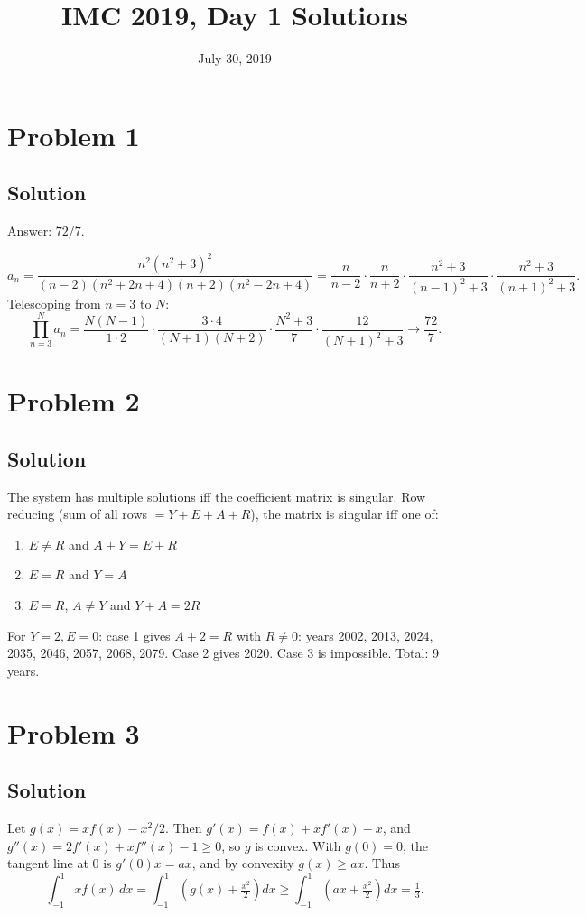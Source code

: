 \documentclass{article}
\title{IMC 2019, Day 1 Solutions}
\date{July 30, 2019}
\begin{document}
\maketitle

\section*{Problem 1}
\subsection*{Solution}
Answer: $72/7$.

\[ a_n = \frac{n^2(n^2+3)^2}{(n-2)(n^2+2n+4)(n+2)(n^2-2n+4)} = \frac{n}{n-2} \cdot \frac{n}{n+2} \cdot \frac{n^2+3}{(n-1)^2+3} \cdot \frac{n^2+3}{(n+1)^2+3}. \]
Telescoping from $n = 3$ to $N$:
\[ \prod_{n=3}^N a_n = \frac{N(N-1)}{1 \cdot 2} \cdot \frac{3 \cdot 4}{(N+1)(N+2)} \cdot \frac{N^2+3}{7} \cdot \frac{12}{(N+1)^2+3} \to \frac{72}{7}. \]

\section*{Problem 2}
\subsection*{Solution}
The system has multiple solutions iff the coefficient matrix is singular. Row reducing (sum of all rows $= Y+E+A+R$), the matrix is singular iff one of:
\begin{enumerate}
\item $E \neq R$ and $A + Y = E + R$
\item $E = R$ and $Y = A$
\item $E = R$, $A \neq Y$ and $Y + A = 2R$
\end{enumerate}
For $Y = 2, E = 0$: case 1 gives $A + 2 = R$ with $R \neq 0$: years 2002, 2013, 2024, 2035, 2046, 2057, 2068, 2079. Case 2 gives 2020. Case 3 is impossible. Total: 9 years.

\section*{Problem 3}
\subsection*{Solution}
Let $g(x) = x f(x) - x^2/2$. Then $g'(x) = f(x) + x f'(x) - x$, and $g''(x) = 2 f'(x) + x f''(x) - 1 \geq 0$, so $g$ is convex. With $g(0) = 0$, the tangent line at $0$ is $g'(0) x = ax$, and by convexity $g(x) \geq ax$. Thus
\[ \int_{-1}^1 x f(x)\, dx = \int_{-1}^1 \left(g(x) + \tfrac{x^2}{2}\right) dx \geq \int_{-1}^1 \left(ax + \tfrac{x^2}{2}\right) dx = \tfrac{1}{3}. \]
\end{document}
